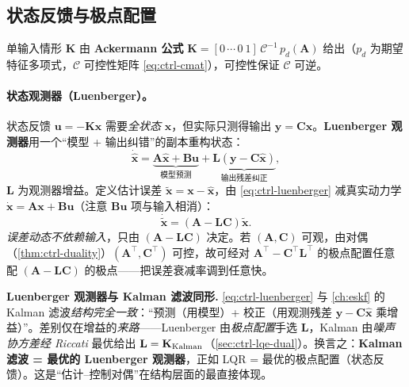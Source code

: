 \subsection{状态反馈与极点配置}
\label{sec:ctrl-pole-placement}

 单输入情形 $\mathbf{K}$ 由 \textbf{Ackermann 公式} $\mathbf{K}=[0\,\cdots\,0\ 1]\,\mathcal{C}^{-1}\,p_d(\mathbf{A})$ 给出（$p_d$ 为期望特征多项式，$\mathcal{C}$ 可控性矩阵 \cref{eq:ctrl-cmat}），可控性保证 $\mathcal{C}$ 可逆。

\paragraph{状态观测器（Luenberger）。}
状态反馈 $\mathbf{u}=-\mathbf{K}\mathbf{x}$ 需要\emph{全状态} $\mathbf{x}$，但实际只测得输出 $\mathbf{y}=\mathbf{C}\mathbf{x}$。\textbf{Luenberger 观测器}用一个“模型 + 输出纠错”的副本重构状态\cite{astrom2008feedback}：
\begin{equation}
  \dot{\hat{\mathbf{x}}}=\underbrace{\mathbf{A}\hat{\mathbf{x}}+\mathbf{B}\mathbf{u}}_{\text{模型预测}}+\underbrace{\mathbf{L}(\mathbf{y}-\mathbf{C}\hat{\mathbf{x}})}_{\text{输出残差纠正}},
  \label{eq:ctrl-luenberger}
\end{equation}
$\mathbf{L}$ 为观测器增益。定义估计误差 $\tilde{\mathbf{x}}=\mathbf{x}-\hat{\mathbf{x}}$，由 \cref{eq:ctrl-luenberger} 减真实动力学 $\dot{\mathbf{x}}=\mathbf{A}\mathbf{x}+\mathbf{B}\mathbf{u}$（注意 $\mathbf{B}\mathbf{u}$ 项与输入相消）：
\begin{equation}
  \boxed{\dot{\tilde{\mathbf{x}}}=(\mathbf{A}-\mathbf{L}\mathbf{C})\tilde{\mathbf{x}}.}
  \label{eq:ctrl-obs-error}
\end{equation}
\emph{误差动态不依赖输入}，只由 $(\mathbf{A}-\mathbf{L}\mathbf{C})$ 决定。若 $(\mathbf{A},\mathbf{C})$ 可观，由对偶（\cref{thm:ctrl-duality}）$(\mathbf{A}^\top,\mathbf{C}^\top)$ 可控，故可经对 $\mathbf{A}^\top-\mathbf{C}^\top\mathbf{L}^\top$ 的极点配置任意配 $(\mathbf{A}-\mathbf{L}\mathbf{C})$ 的极点——把误差衰减率调到任意快。

\begin{note}
\textbf{Luenberger 观测器与 Kalman 滤波同形.}\;
\cref{eq:ctrl-luenberger} 与 \cref{ch:eskf} 的 Kalman 滤波\emph{结构完全一致}：“预测（用模型）+ 校正（用观测残差 $\mathbf{y}-\mathbf{C}\hat{\mathbf{x}}$ 乘增益）”。差别仅在增益的\emph{来路}——Luenberger 由\emph{极点配置}手选 $\mathbf{L}$，Kalman 由\emph{噪声协方差经 Riccati} 最优给出 $\mathbf{L}=\mathbf{K}_{\rm Kalman}$（\cref{sec:ctrl-lqe-dual}）。换言之：\textbf{Kalman 滤波 = 最优的 Luenberger 观测器}，正如 LQR = 最优的极点配置（状态反馈）。这是“估计--控制对偶”在结构层面的最直接体现。
\end{note}

